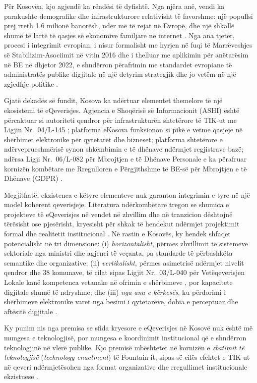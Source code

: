 \documentclass[conference]{IEEEtran}
\begin{document}
Për Kosovën, kjo agjendë ka rëndësi të dyfishtë. Nga njëra anë, vendi ka
parakushte demografike dhe infrastrukturore relativisht të favorshme:
një popullsi prej rreth 1.6 milionë banorësh, ndër më të rejat në Evropë,
dhe një shkallë shumë të lartë të qasjes së ekonomive familjare në
internet \cite{ask2023}. %
Nga ana tjetër, procesi i integrimit evropian, i nisur formalisht me
hyrjen në fuqi të Marrëveshjes së Stabilizim-Asociimit në vitin 2016 dhe i
thelluar me aplikimin për anëtarësim në BE në dhjetor 2022, e shndërron
përafrimin me standardet evropiane të administratës publike digjitale në
një detyrim strategjik dhe jo vetëm në një zgjedhje politike
\cite{ec2024,sigma2023}.

Gjatë dekadës së fundit, Kosova ka ndërtuar elementet themelore të një
ekosistemi të eQeverisjes. Agjencia e Shoqërisë së Informacionit (ASHI)
është përcaktuar si autoriteti qendror për infrastrukturën shtetërore të
TIK-ut me Ligjin Nr.~04/L-145 \cite{ligji04L145}; platforma eKosova
funksionon si pikë e vetme qasjeje në shërbimet elektronike për qytetarët
dhe bizneset; platforma shtetërore e ndërveprueshmërisë synon shkëmbimin
e të dhënave ndërmjet regjistrave bazë; ndërsa Ligji Nr.~06/L-082 për
Mbrojtjen e të Dhënave Personale e ka përafruar kornizën kombëtare me
Rregulloren e Përgjithshme të BE-së për Mbrojtjen e të Dhënave (GDPR)
\cite{ligji06L082}.

Megjithatë, ekzistenca e këtyre elementeve nuk garanton integrimin e tyre
në një model koherent qeverisjeje. Literatura ndërkombëtare tregon se
shumica e projekteve të eQeverisjes në vendet në zhvillim dhe në tranzicion
dështojnë tërësisht ose pjesërisht, kryesisht për shkak të hendekut
ndërmjet projektimit formal dhe realitetit institucional \cite{heeks2003}.
Në rastin e Kosovës, ky hendek shfaqet potencialisht në tri dimensione:
(i) \textit{horizontalisht}, përmes zhvillimit të sistemeve sektoriale nga
ministri dhe agjenci të veçanta, pa standarde të përbashkëta semantike dhe
organizative; (ii) \textit{vertikalisht}, përmes asimetrisë ndërmjet
nivelit qendror dhe 38 komunave, të cilat sipas Ligjit Nr.~03/L-040 për
Vetëqeverisjen Lokale kanë kompetenca vetanake në ofrimin e shërbimeve
\cite{ligji03L040}, por kapacitete digjitale shumë të ndryshme; dhe
(iii) \textit{nga ana e kërkesës}, ku përdorimi i shërbimeve elektronike
varet nga besimi i qytetarëve, dobia e perceptuar dhe aftësitë digjitale
\cite{carter2005}.

Ky punim nis nga premisa se sfida kryesore e eQeverisjes në Kosovë nuk
është më mungesa e teknologjisë, por mungesa e koordinimit institucional
që e shndërron teknologjinë në vlerë publike. Kjo premisë mbështetet në
kornizën e \textit{zbatimit të teknologjisë} (\textit{technology
enactment}) të Fountain-it, sipas së cilës efektet e TIK-ut në qeveri
ndërmjetësohen nga format organizative dhe rregullimet institucionale
ekzistuese \cite{fountain2001}.
\end{document}
